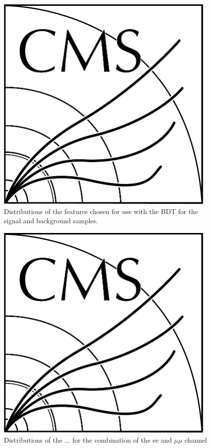 \begin{figure}[tbp]
\centering
\includegraphics[width=0.97\textwidth]{CMS-bw-logo.pdf}
\caption{
Distributions of the features chosen for use with the BDT for the signal and background samples.}
\label{fig:inputFeaturesDistributions}
\end{figure}

\begin{figure}[tbp]
\centering
\includegraphics[width=0.97\textwidth]{CMS-bw-logo.pdf}
\caption{
Distributions of the ... for the combination of the ee and $\mu\mu$ channel}
\label{fig:inputFeaturesDataSimAgreement}
\end{figure}

